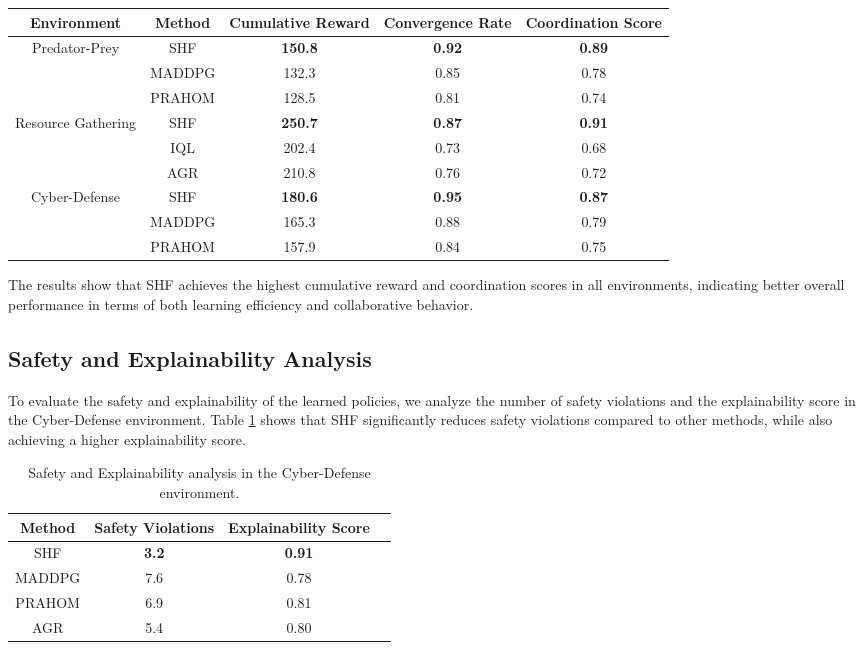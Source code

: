 \documentclass[sigconf,anonymous]{aamas}
\begin{document}
\begin{table*}[ht]
\centering
\caption{Performance comparison of SHF and baseline methods across different environments.}
\label{table:overall_performance}
\begin{tabular}{|c|c|c|c|c|}
\hline
\textbf{Environment} & \textbf{Method} & \textbf{Cumulative Reward} & \textbf{Convergence Rate} & \textbf{Coordination Score} \\ \hline
\multirow{3}{*}{Predator-Prey} & SHF & \textbf{150.8} & \textbf{0.92} & \textbf{0.89} \\ \cline{2-5} 
                               & MADDPG & 132.3 & 0.85 & 0.78 \\ \cline{2-5} 
                               & PRAHOM & 128.5 & 0.81 & 0.74 \\ \hline
\multirow{3}{*}{Resource Gathering} & SHF & \textbf{250.7} & \textbf{0.87} & \textbf{0.91} \\ \cline{2-5} 
                                    & IQL & 202.4 & 0.73 & 0.68 \\ \cline{2-5} 
                                    & AGR & 210.8 & 0.76 & 0.72 \\ \hline
\multirow{3}{*}{Cyber-Defense} & SHF & \textbf{180.6} & \textbf{0.95} & \textbf{0.87} \\ \cline{2-5} 
                               & MADDPG & 165.3 & 0.88 & 0.79 \\ \cline{2-5} 
                               & PRAHOM & 157.9 & 0.84 & 0.75 \\ \hline
\end{tabular}
\end{table*}

The results show that SHF achieves the highest cumulative reward and coordination scores in all environments, indicating better overall performance in terms of both learning efficiency and collaborative behavior.

\subsection{Safety and Explainability Analysis}
To evaluate the safety and explainability of the learned policies, we analyze the number of safety violations and the explainability score in the Cyber-Defense environment. Table \ref{table:safety_explainability} shows that SHF significantly reduces safety violations compared to other methods, while also achieving a higher explainability score.

\begin{table}[ht]
\centering
\caption{Safety and Explainability analysis in the Cyber-Defense environment.}
\label{table:safety_explainability}
\begin{tabular}{|c|c|c|c|}
\hline
\textbf{Method} & \textbf{Safety Violations} & \textbf{Explainability Score} \\ \hline
SHF & \textbf{3.2} & \textbf{0.91} \\ \hline
MADDPG & 7.6 & 0.78 \\ \hline
PRAHOM & 6.9 & 0.81 \\ \hline
AGR & 5.4 & 0.80 \\ \hline
\end{tabular}
\end{table}
\end{document}
